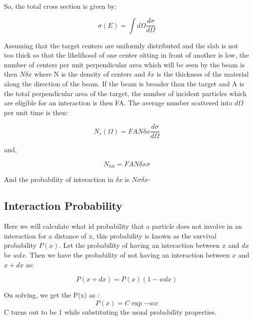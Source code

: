\documentclass{article}
\begin{document}
\begin{multicols}{2}
So, the total cross section is given by:

\begin{equation}
    \sigma(E)=\int d \Omega \frac{d \sigma}{d \Omega}
\end{equation}


Assuming that the target centers are uniformly distributed and 
the slab is not too thick so that the likelihood of one center sitting 
in front of another is low, the number of centers per unit perpendicular 
area which will be seen by the beam is then $N\delta x$ where N is the 
density of centers and $\delta x$ is the thickness of the material along 
the direction of the beam. If the beam is broader than the target and A is 
the total perpendicular area of the target, the number of incident particles 
which are eligible for an interaction is then FA. The average number scattered 
into $d\Omega$ per unit time is then:

\begin{equation}
    N_s(\Omega) = FAN\delta x \frac{d\sigma}{d\Omega}
\end{equation}

and,

\begin{equation}
    N_{tot} = FAN \delta x \sigma
\end{equation}

And the probability of interaction in $\delta x$ is $N\sigma \delta x$-\cite{leo1988techniques}

\subsection{Interaction Probability}

Here we will calculate what id probability that a particle does not involve
in an interaction for a distance of x, this probability is known as the 
survival probability $P(x)$. Let the probability of having an interaction between 
$x$ and $dx$ be $wdx$. Then we have the probability of not having an interaction
between $x$ and $x+dx$ as:

\begin{equation}
    P(x+dx) = P(x)(1-wdx)
\end{equation}

On solving, we get the P(x) as :
\begin{equation}
    P(x) = C\exp{-wx}
\end{equation}
C turns out to be 1 while substituting the usual probability properties.



\end{multicols}
\end{document}
